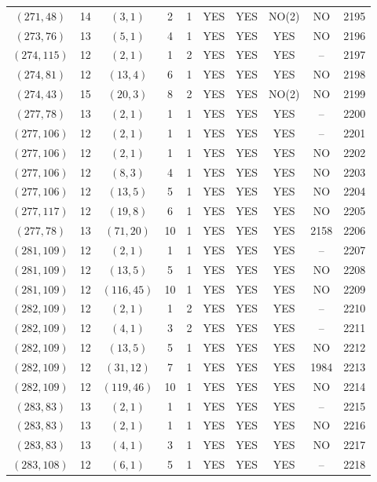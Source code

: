 \begin{longtable}{|c|c|c|c|c|c|c|c|c|c|}
$(271, 48)$ & 14 & $(3, 1)$ & 2 & 1 & YES & YES & NO(2) & NO & 2195\\
$(273, 76)$ & 13 & $(5, 1)$ & 4 & 1 & YES & YES & YES & NO & 2196\\
$(274, 115)$ & 12 & $(2, 1)$ & 1 & 2 & YES & YES & YES & -- & 2197\\
$(274, 81)$ & 12 & $(13, 4)$ & 6 & 1 & YES & YES & YES & NO & 2198\\
$(274, 43)$ & 15 & $(20, 3)$ & 8 & 2 & YES & YES & NO(2) & NO & 2199\\
$(277, 78)$ & 13 & $(2, 1)$ & 1 & 1 & YES & YES & YES & -- & 2200\\
$(277, 106)$ & 12 & $(2, 1)$ & 1 & 1 & YES & YES & YES & -- & 2201\\
$(277, 106)$ & 12 & $(2, 1)$ & 1 & 1 & YES & YES & YES & NO & 2202\\
$(277, 106)$ & 12 & $(8, 3)$ & 4 & 1 & YES & YES & YES & NO & 2203\\
$(277, 106)$ & 12 & $(13, 5)$ & 5 & 1 & YES & YES & YES & NO & 2204\\
$(277, 117)$ & 12 & $(19, 8)$ & 6 & 1 & YES & YES & YES & NO & 2205\\
$(277, 78)$ & 13 & $(71, 20)$ & 10 & 1 & YES & YES & YES & 2158 & 2206\\
$(281, 109)$ & 12 & $(2, 1)$ & 1 & 1 & YES & YES & YES & -- & 2207\\
$(281, 109)$ & 12 & $(13, 5)$ & 5 & 1 & YES & YES & YES & NO & 2208\\
$(281, 109)$ & 12 & $(116, 45)$ & 10 & 1 & YES & YES & YES & NO & 2209\\
$(282, 109)$ & 12 & $(2, 1)$ & 1 & 2 & YES & YES & YES & -- & 2210\\
$(282, 109)$ & 12 & $(4, 1)$ & 3 & 2 & YES & YES & YES & -- & 2211\\
$(282, 109)$ & 12 & $(13, 5)$ & 5 & 1 & YES & YES & YES & NO & 2212\\
$(282, 109)$ & 12 & $(31, 12)$ & 7 & 1 & YES & YES & YES & 1984 & 2213\\
$(282, 109)$ & 12 & $(119, 46)$ & 10 & 1 & YES & YES & YES & NO & 2214\\
$(283, 83)$ & 13 & $(2, 1)$ & 1 & 1 & YES & YES & YES & -- & 2215\\
$(283, 83)$ & 13 & $(2, 1)$ & 1 & 1 & YES & YES & YES & NO & 2216\\
$(283, 83)$ & 13 & $(4, 1)$ & 3 & 1 & YES & YES & YES & NO & 2217\\
$(283, 108)$ & 12 & $(6, 1)$ & 5 & 1 & YES & YES & YES & -- & 2218\\

\end{longtable}
